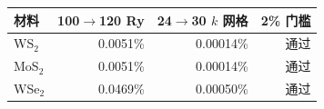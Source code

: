 \begin{tabular}{lrrr}
\toprule
材料 & 100$\to$120 Ry & 24$\to$30 $k$ 网格 & 2\% 门槛 \\
\midrule
WS$_2$ & 0.0051\% & 0.00014\% & 通过 \\
MoS$_2$ & 0.0051\% & 0.00014\% & 通过 \\
WSe$_2$ & 0.0469\% & 0.00050\% & 通过 \\
\bottomrule
\end{tabular}

